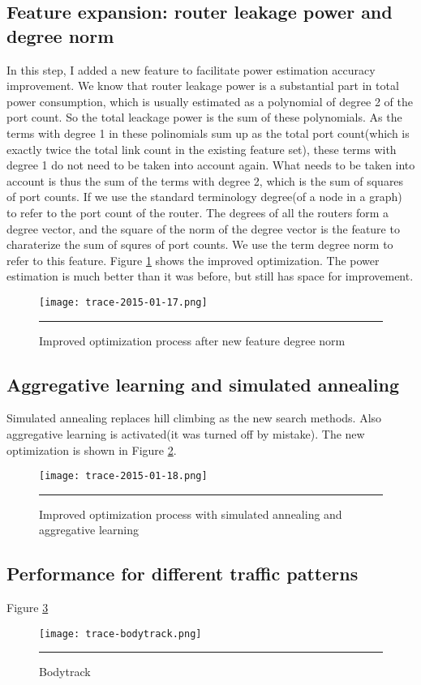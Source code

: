 \documentclass[12pt]{article}
\theoremstyle{definition}
\begin{document}
\subsection{Feature expansion: router leakage power and degree norm}
In this step, I added a new feature to facilitate power estimation accuracy improvement. We know that router leakage power is a substantial part in total power consumption, which is usually estimated as a polynomial of degree 2 of the port count. \cite{sanchez2010analysis, chan2005nocee} So the total leackage power is the sum of these polynomials. As the terms with degree 1 in these polinomials sum up as the total port count(which is exactly twice the total link count in the existing feature set), these terms with degree 1 do not need to be taken into account again. What needs to be taken into account is thus the sum of the terms with degree 2, which is the sum of squares of port counts. If we use the standard terminology degree(of a node in a graph) to refer to the port count of the router. The degrees of all the routers form a degree vector, and the square of the norm of the degree vector is the feature to charaterize the sum of squres of port counts. We use the term degree norm to refer to this feature. Figure \ref{fig:degree_norm} shows the improved optimization. The power estimation is much better than it was before, but still has space for improvement.
\begin{figure}[htb]
  \centering
      {\texttt{[image: trace-2015-01-17.png]}}
      \rule{\linewidth}{1pt}
      \caption{Improved optimization process after new feature degree norm}
      \label{fig:degree_norm}
\end{figure}
\subsection{Aggregative learning and simulated annealing}
Simulated annealing replaces hill climbing as the new search methods. Also aggregative learning is activated(it was turned off by mistake). The new optimization is shown in Figure \ref{fig:simulated_annealing}.
\begin{figure}[htb]
  \centering
      {\texttt{[image: trace-2015-01-18.png]}}
      \rule{\linewidth}{1pt}
      \caption{Improved optimization process with simulated annealing and aggregative learning}
      \label{fig:simulated_annealing}
\end{figure}
\subsection{Performance for different traffic patterns}
Figure \ref{fig:bodytrack}
\begin{figure}[htb]
  \centering
      {\texttt{[image: trace-bodytrack.png]}}
      \rule{\linewidth}{1pt}
      \caption{Bodytrack}
      \label{fig:bodytrack}
\end{figure}
\end{document}
